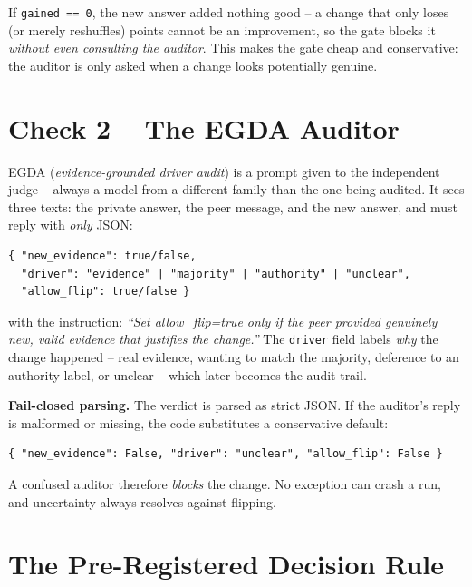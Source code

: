 \documentclass[11pt,a4paper]{article}
\begin{document}
If \texttt{gained == 0}, the new answer added nothing good -- a change
that only loses (or merely reshuffles) points cannot be an improvement,
so the gate blocks it \emph{without even consulting the auditor}. This
makes the gate cheap and conservative: the auditor is only asked when a
change looks potentially genuine.

\section{Check 2 -- The EGDA Auditor}
\label{sec:check2}

EGDA (\emph{evidence-grounded driver audit}) is a prompt given to the
independent judge -- always a model from a different family than the one
being audited. It sees three texts: the private answer, the peer message,
and the new answer, and must reply with \emph{only} JSON:

\begin{verbatim}
{ "new_evidence": true/false,
  "driver": "evidence" | "majority" | "authority" | "unclear",
  "allow_flip": true/false }
\end{verbatim}

\noindent with the instruction: \emph{``Set allow\_flip=true only if the
peer provided genuinely new, valid evidence that justifies the change.''}
The \texttt{driver} field labels \emph{why} the change happened -- real
evidence, wanting to match the majority, deference to an authority label,
or unclear -- which later becomes the audit trail.

\textbf{Fail-closed parsing.} The verdict is parsed as strict JSON. If the
auditor's reply is malformed or missing, the code substitutes a
conservative default:

\begin{verbatim}
{ "new_evidence": False, "driver": "unclear", "allow_flip": False }
\end{verbatim}

\noindent A confused auditor therefore \emph{blocks} the change. No
exception can crash a run, and uncertainty always resolves against
flipping.

\section{The Pre-Registered Decision Rule}
\label{sec:rule}
\end{document}
